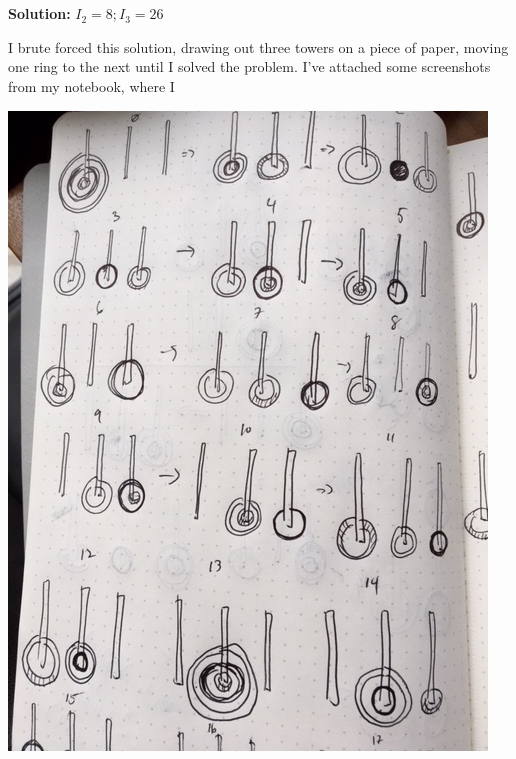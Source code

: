 \documentclass{article}
\begin{document}
\newpage

\section{}

\subsection{}

\textbf{Solution: } $I_2 = 8; I_3 = 26$

I brute forced this solution, drawing out three towers on a piece of paper, moving one ring to the next until I solved the problem. I've attached some screenshots from my notebook, where I 

\includegraphics[scale=.5]{towers-1} \\
\end{document}
